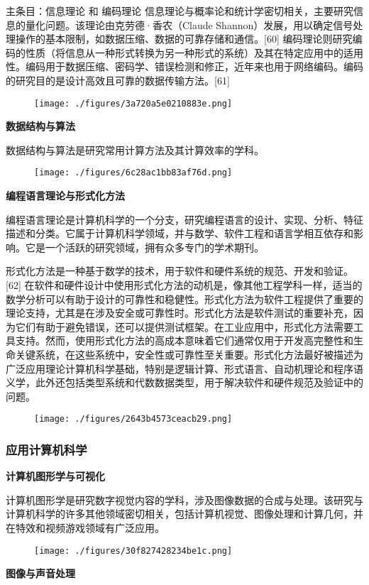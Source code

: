 主条目：信息理论 和 编码理论  
信息理论与概率论和统计学密切相关，主要研究信息的量化问题。该理论由克劳德·香农（Claude Shannon）发展，用以确定信号处理操作的基本限制，如数据压缩、数据的可靠存储和通信。[60] 编码理论则研究编码的性质（将信息从一种形式转换为另一种形式的系统）及其在特定应用中的适用性。编码用于数据压缩、密码学、错误检测和修正，近年来也用于网络编码。编码的研究目的是设计高效且可靠的数据传输方法。[61]
\begin{figure}[ht]
\centering
\texttt{[image: ./figures/3a720a5e0210883e.png]}
\caption{} \label{fig_JSS_5}
\end{figure}
\textbf{数据结构与算法}  

数据结构与算法是研究常用计算方法及其计算效率的学科。
\begin{figure}[ht]
\centering
\texttt{[image: ./figures/6c28ac1bb83af76d.png]}
\caption{} \label{fig_JSS_6}
\end{figure}
\textbf{编程语言理论与形式化方法}  

编程语言理论是计算机科学的一个分支，研究编程语言的设计、实现、分析、特征描述和分类。它属于计算机科学领域，并与数学、软件工程和语言学相互依存和影响。它是一个活跃的研究领域，拥有众多专门的学术期刊。

形式化方法是一种基于数学的技术，用于软件和硬件系统的规范、开发和验证。[62] 在软件和硬件设计中使用形式化方法的动机是，像其他工程学科一样，适当的数学分析可以有助于设计的可靠性和稳健性。形式化方法为软件工程提供了重要的理论支持，尤其是在涉及安全或可靠性时。形式化方法是软件测试的重要补充，因为它们有助于避免错误，还可以提供测试框架。在工业应用中，形式化方法需要工具支持。然而，使用形式化方法的高成本意味着它们通常仅用于开发高完整性和生命关键系统，在这些系统中，安全性或可靠性至关重要。形式化方法最好被描述为广泛应用理论计算机科学基础，特别是逻辑计算、形式语言、自动机理论和程序语义学，此外还包括类型系统和代数数据类型，用于解决软件和硬件规范及验证中的问题。
\begin{figure}[ht]
\centering
\texttt{[image: ./figures/2643b4573ceacb29.png]}
\caption{} \label{fig_JSS_7}
\end{figure}
\subsubsection{应用计算机科学}  
\textbf{计算机图形学与可视化}  

计算机图形学是研究数字视觉内容的学科，涉及图像数据的合成与处理。该研究与计算机科学的许多其他领域密切相关，包括计算机视觉、图像处理和计算几何，并在特效和视频游戏领域有广泛应用。
\begin{figure}[ht]
\centering
\texttt{[image: ./figures/30f827428234be1c.png]}
\caption{} \label{fig_JSS_8}
\end{figure}
\textbf{图像与声音处理}  

